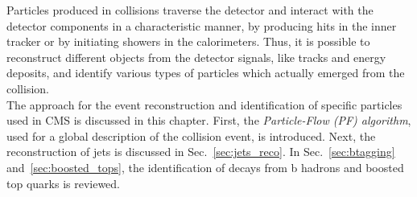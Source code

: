 Particles produced in \pp collisions traverse the detector and interact with the detector components in a characteristic manner, \eg by producing hits in the inner tracker or by initiating showers in the calorimeters. Thus, it is possible to reconstruct different objects from the detector signals, like tracks and energy deposits, and identify various types of particles which actually emerged from the collision. \\
The approach for the event reconstruction and identification of specific particles used in CMS is discussed in this chapter. First, the \textit{Particle-Flow (PF) algorithm}, used for a global description of the collision event, is introduced. Next, the reconstruction of jets is discussed in Sec.~\ref{sec:jets_reco}. In Sec.~\ref{sec:btagging} and~\ref{sec:boosted_tops}, the identification of decays from b hadrons and boosted top quarks is reviewed.
